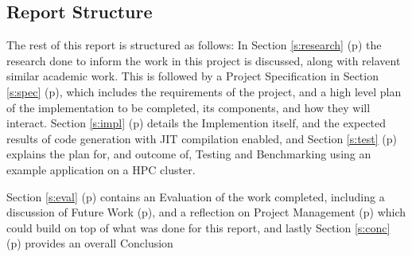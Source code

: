 \clearpage
\subsection{Report Structure}
The rest of this report is structured as follows: In Section \ref{s:research} (p\pageref{s:research}) the research done to inform the work in this project is discussed, along with relavent similar academic work. This is followed by a Project Specification in Section \ref{s:spec} (p\pageref{s:spec}), which includes the requirements of the project, and a high level plan of the implementation to be completed, its components, and how they will interact.
Section \ref{s:impl} (p\pageref{s:impl}) details the Implemention itself, and the expected results of code generation with JIT compilation enabled, and Section \ref{s:test} (p\pageref{s:test}) explains the plan for, and outcome of, Testing and Benchmarking using an example application on a HPC cluster.
\par Section \ref{s:eval} (p\pageref{s:eval}) contains an Evaluation of the work completed, including a discussion of Future Work (p\pageref{ss:fw}), and a reflection on Project Management (p\pageref{ss:pm}) which could build on top of what was done for this report, and lastly Section \ref{s:conc} (p\pageref{s:conc}) provides an overall Conclusion
